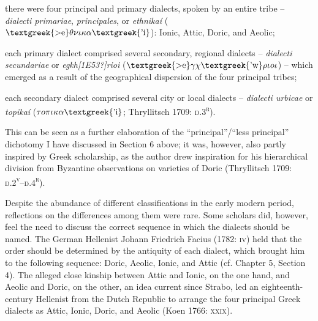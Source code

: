 \setcounter{listWWNumxiileveli}{0}
\begin{listWWNumxiileveli}
\item 
\begin{styleStandard}
there were four principal and primary dialects, spoken by an entire tribe – \textit{dialecti primariae}, \textit{principales},\textit{ }or \textit{ethnikaí }($\text{\textgreek{>e}}\theta \nu \iota \kappa \alpha \text{\textgreek{'i}}$): Ionic, Attic, Doric, and Aeolic;
\end{styleStandard}
\item 
\begin{styleStandard}
each primary dialect comprised several secondary, regional dialects – \textit{dialecti secundariae }or \textit{egkh[1E53?]rioi} ($\text{\textgreek{>e}}\gamma \chi \text{\textgreek{'w}}\rho \iota o\iota $) – which emerged as a result of the geographical dispersion of the four principal tribes;
\end{styleStandard}
\item 
\begin{styleStandard}
each secondary dialect comprised several city or local dialects – \textit{dialecti urbicae} or \textit{topikaí }($\tau o\pi \iota \kappa \alpha \text{\textgreek{'i}}$; Thryllitsch 1709: \textsc{d.3}\textsc{\textsuperscript{r}}).
\end{styleStandard}
\end{listWWNumxiileveli}
\begin{styleStandard}
This can be seen as a further elaboration of the “principal”/“less principal” dichotomy I have discussed in Section 6 above; it was, however, also partly inspired by Greek scholarship, as the author drew inspiration for his hierarchical division from Byzantine observations on varieties of Doric (Thryllitsch 1709: \textsc{d.2}\textsc{\textsuperscript{v}}\textsc{–d.4}\textsc{\textsuperscript{r}}).
\end{styleStandard}

\begin{styleStandard}
Despite the abundance of different classifications in the early modern period, reflections on the differences among them were rare. Some scholars did, however, feel the need to discuss the correct sequence in which the dialects should be named. The German Hellenist Johann Friedrich Facius (1782: \textsc{iv}) held that the order should be determined by the antiquity of each dialect, which brought him to the following sequence: Doric, Aeolic, Ionic, and Attic (cf. Chapter 5, Section 4). The alleged close kinship between Attic and Ionic, on the one hand, and Aeolic and Doric, on the other, an idea current since Strabo, led an eighteenth-century Hellenist from the Dutch Republic to arrange the four principal Greek dialects as Attic, Ionic, Doric, and Aeolic (Koen 1766: \textsc{xxix}).
\end{styleStandard}

